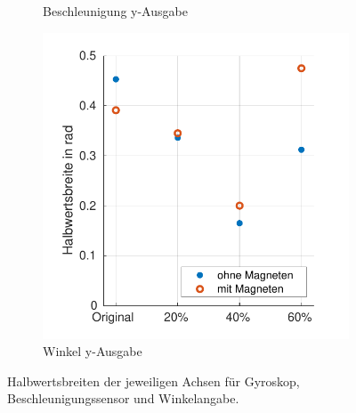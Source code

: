 \begin{figure}[tb!]
\begin{adjustwidth}{-0.1\linewidth}{-0.1\linewidth}
\begin{subfigure}[c]{.32\linewidth}
			\caption{Beschleunigung y-Ausgabe}
			\vspace{5pt}
		\end{subfigure}
		\hfill
		\begin{subfigure}[c]{.32\linewidth}
			\centering
			\includegraphics[width=\linewidth]{Bilder/fwhm_AngleY.pdf}
			\caption{Winkel y-Ausgabe}
			\vspace{5pt}
		\end{subfigure}
	\end{adjustwidth}
	\caption{Halbwertsbreiten der jeweiligen Achsen für Gyroskop, Beschleunigungssensor und Winkelangabe.} \label{fwhm}
\end{figure}


